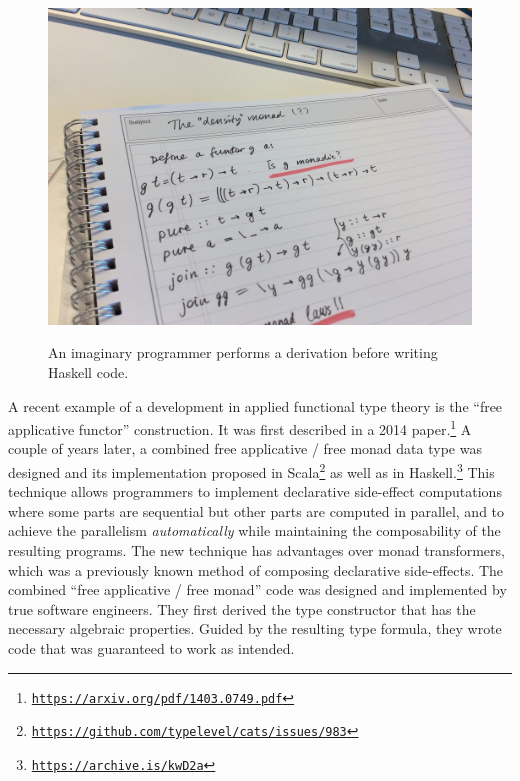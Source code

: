 \begin{figure}
\begin{centering}
{\footnotesize{}\includegraphics[width=0.6\linewidth]{ftt-example}}{\footnotesize\par}
\par\end{centering}
\caption{An imaginary programmer performs a derivation before writing Haskell
code.\label{fig:Example-calculation-in-type-theory}}

\end{figure}

A recent example of a development in applied functional type theory
is the \textsf{``}free applicative functor\textsf{''} construction. It was first described
in a 2014 paper.\footnote{\texttt{\href{https://arxiv.org/pdf/1403.0749.pdf}{https://arxiv.org/pdf/1403.0749.pdf}}}
A couple of years later, a combined free applicative / free monad
data type was designed and its implementation proposed in Scala\footnote{\texttt{\href{https://github.com/typelevel/cats/issues/983}{https://github.com/typelevel/cats/issues/983}}}
as well as in Haskell.\footnote{\texttt{\href{https://elvishjerricco.github.io/2016/04/08/applicative-effects-in-free-monads.html}{https://archive.is/kwD2a}}}
This technique allows programmers to implement declarative side-effect
computations where some parts are sequential but other parts are computed
in parallel, and to achieve the parallelism \emph{automatically} while
maintaining the composability of the resulting programs. The new technique
has advantages over monad transformers, which was a previously known
method of composing declarative side-effects. The combined \textsf{``}free
applicative / free monad\textsf{''} code was designed and implemented by true
software engineers. They first derived the type constructor that has
the necessary algebraic properties. Guided by the resulting type formula,
they wrote code that was guaranteed to work as intended.

